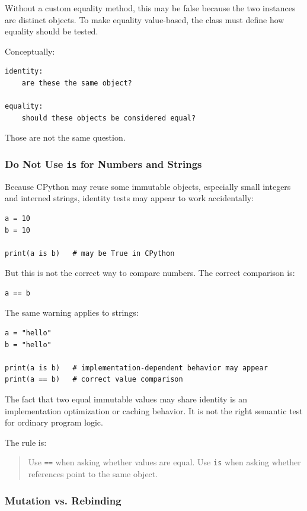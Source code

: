 Without a custom equality method, this may be false because the two instances are distinct objects. To make equality value-based, the class must define how equality should be tested.

Conceptually:

\begin{verbatim}
identity:
    are these the same object?

equality:
    should these objects be considered equal?
\end{verbatim}

Those are not the same question.

\subsubsection*{Do Not Use \texttt{is} for Numbers and Strings}

Because CPython may reuse some immutable objects, especially small integers and interned strings, identity tests may appear to work accidentally:

\begin{verbatim}
a = 10
b = 10

print(a is b)   # may be True in CPython
\end{verbatim}

But this is not the correct way to compare numbers. The correct comparison is:

\begin{verbatim}
a == b
\end{verbatim}

The same warning applies to strings:

\begin{verbatim}
a = "hello"
b = "hello"

print(a is b)   # implementation-dependent behavior may appear
print(a == b)   # correct value comparison
\end{verbatim}

The fact that two equal immutable values may share identity is an implementation optimization or caching behavior. It is not the right semantic test for ordinary program logic.

The rule is:

\begin{quote}
Use \texttt{==} when asking whether values are equal. Use \texttt{is} when asking whether references point to the same object.
\end{quote}

\subsubsection*{Mutation vs. Rebinding}

